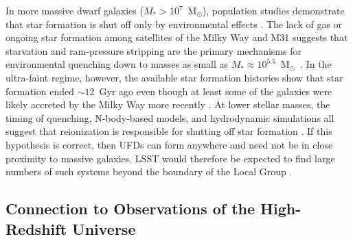 \documentclass[a4paper]{ar-1col}
\newcommand{\msun}        {M$_{\odot}$}
\begin{document}
In more massive dwarf galaxies ($M_{*} > 10^{7}$~\msun), population
studies demonstrate that star formation is shut off only by
environmental effects \citep{geha12}.  The lack of gas or ongoing star
formation among satellites of the Milky Way and M31 suggests that
starvation and ram-pressure stripping are the primary mechanisms for
environmental quenching down to masses as small as $M_{*} \approx
10^{5.5}$~\msun\ \citep{wetzel15,fillingham15,fillingham16,fillingham18}.
In the ultra-faint regime, however, the available star formation
histories show that star formation ended $\sim12$~Gyr ago
\citep{brown14} even though at least some of the galaxies were likely
accreted by the Milky Way more recently
\citep{rocha12,simon18,fritz18b}.  At lower stellar masses, the timing
of quenching, N-body-based models, and hydrodynamic simulations all
suggest that reionization is responsible for shutting off star
formation \citep{brown14,jeon17,fitts17,wimberly18}.  If this
hypothesis is correct, then UFDs can form anywhere and need not be in
close proximity to massive galaxies.  LSST would therefore be expected
to find large numbers of such systems beyond the boundary of the Local
Group \citep{wimberly18}.


\subsection{Connection to Observations of the High-Redshift Universe}
\label{sec:highz}
\end{document}
